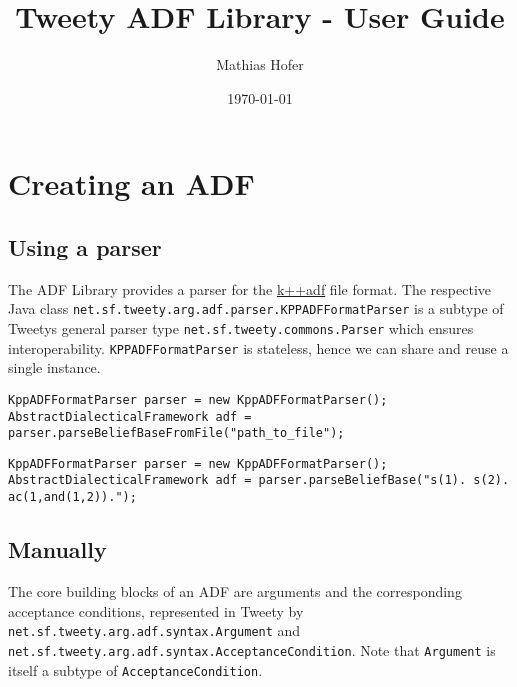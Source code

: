 \documentclass{scrartcl}[a4paper,10pt]
\title{Tweety ADF Library - User Guide}
\author{Mathias Hofer}
\date{\today}
\newcommand{\jlstinline}[1]{\lstinline[style=java]|#1|}
\begin{document}
	
\maketitle

\tableofcontents

\pagebreak

\section{Creating an ADF}

\subsection{Using a parser}

The ADF Library provides a parser for the \hyperlink{https://www.cs.helsinki.fi/group/coreo/k++adf/}{k++adf} file format. The respective Java class \jlstinline{net.sf.tweety.arg.adf.parser.KPPADFFormatParser} is a subtype of Tweetys general parser type \jlstinline{net.sf.tweety.commons.Parser} which ensures interoperability. \jlstinline{KPPADFFormatParser} is stateless, hence we can share and reuse a single instance.

\begin{lstlisting}[style=java,caption=Parse from file.]
KppADFFormatParser parser = new KppADFFormatParser();
AbstractDialecticalFramework adf = parser.parseBeliefBaseFromFile("path_to_file");
\end{lstlisting}

\begin{lstlisting}[style=java,caption=Parse from string.]
KppADFFormatParser parser = new KppADFFormatParser();
AbstractDialecticalFramework adf = parser.parseBeliefBase("s(1). s(2). ac(1,and(1,2)).");
\end{lstlisting}

\subsection{Manually}

The core building blocks of an ADF are arguments and the corresponding acceptance conditions, represented in Tweety by \jlstinline{net.sf.tweety.arg.adf.syntax.Argument} and \jlstinline{net.sf.tweety.arg.adf.syntax.AcceptanceCondition}. Note that \jlstinline{Argument} is itself a subtype of \jlstinline{AcceptanceCondition}.
\end{document}
